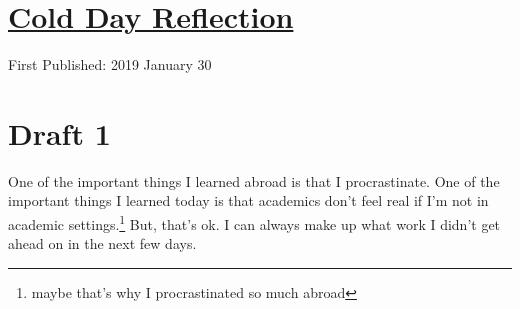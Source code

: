 \documentclass[12pt]{article}[titlepage]
\newcommand{\1}{\={a}}
\newcommand{\2}{\={e}}
\newcommand{\3}{\={\i}}
\newcommand{\4}{\=o}
\newcommand{\5}{\=u}
\newcommand{\6}{\={A}}
\renewcommand{\,}{\textsuperscript{,}}
\begin{document}
\doublespacing
\section{\href{cold-day-reflection.html}{Cold Day Reflection}}
First Published: 2019 January 30

\section{Draft 1}
One of the important things I learned abroad is that I procrastinate.
One of the important things I learned today is that academics don't feel real if I'm not in academic settings.\footnote{maybe that's why I procrastinated so much abroad}
But, that's ok.
I can always make up what work I didn't get ahead on in the next few days.
\end{document}
